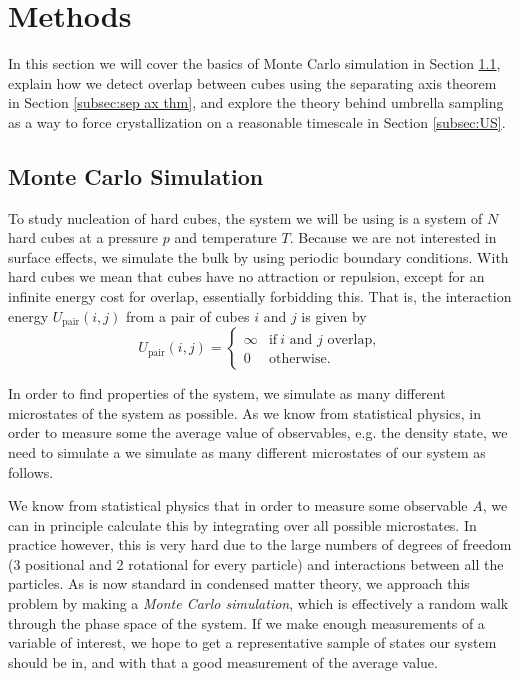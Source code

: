 \documentclass[thesis]{subfiles}
\begin{document}
\section{Methods}

In this section we will cover the basics of Monte Carlo simulation in Section \ref{subsec:MCsim}, explain how we detect overlap between cubes using the separating axis theorem in Section \ref{subsec:sep ax thm}, and explore the theory behind umbrella sampling as a way to force crystallization on a reasonable timescale in Section \ref{subsec:US}.

\subsection{Monte Carlo Simulation}\label{subsec:MCsim}

To study nucleation of hard cubes, the system we will be using is a system of $N$ hard cubes at a pressure $p$ and temperature $T$. Because we are not interested in surface effects, we simulate the bulk by using periodic boundary conditions. With hard cubes we mean that cubes have no attraction or repulsion, except for an infinite energy cost for overlap, essentially forbidding this. That is, the interaction energy $U_{\textrm{pair}}(i,j)$ from a pair of cubes $i$ and $j$ is given by
\begin{equation}
U_{\textrm{pair}}(i,j) = 
\begin{cases}
\infty & \text{if}\ i \text{ and } j \text{ overlap,}\\
0 & \text{otherwise.}
\end{cases}
\end{equation}

In order to find properties of the system, we simulate as many different microstates of the system as possible. As we know from statistical physics, in order to measure some
the average value of observables, e.g. the density state, we need to simulate a 
we simulate as many different microstates of our system as follows. 

We know from statistical physics  that in order to measure some observable $A$, we can in principle calculate this by integrating over all possible microstates. In practice however, this is very hard due to the large numbers of degrees of freedom (3 positional and 2 rotational for every particle) and interactions between all the particles. As is now standard in condensed matter theory, we approach this problem by making a \emph{Monte Carlo simulation}, which is effectively a random walk through the phase space of the system. If we make enough measurements of a variable of interest, we hope to get a representative sample of states our system should be in, and with that a good measurement of the average value. 
\end{document}

